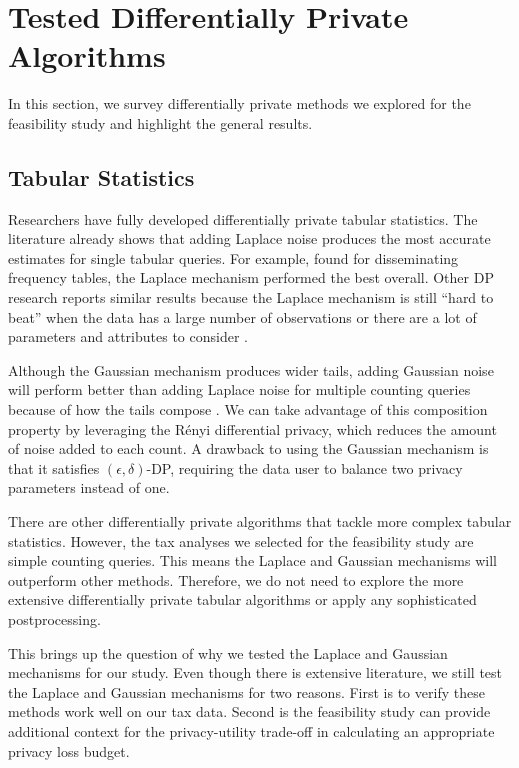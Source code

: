 \section{Tested Differentially Private Algorithms}\label{sec:dp-mech}
In this section, we survey differentially private methods we explored for the feasibility study and highlight the general results.

\subsection{Tabular Statistics}
Researchers have fully developed differentially private tabular statistics. The literature already shows that adding Laplace noise produces the most accurate estimates for single tabular queries. For example, \citet{rinott2018confidentiality} found for disseminating frequency tables, the Laplace mechanism performed the best overall. Other DP research reports similar results because the Laplace mechanism is still ``hard to beat'' when the data has a large number of observations or there are a lot of parameters and attributes to consider \citep{bowen2021differentially,shlomo2018statistical,liu2018generalized}.

Although the Gaussian mechanism produces wider tails, adding Gaussian noise will perform better than adding Laplace noise for multiple counting queries because of how the tails compose \citet{wang2019subsampled}. We can take advantage of this composition property by leveraging the R\'enyi differential privacy, which reduces the amount of noise added to each count. A drawback to using the Gaussian mechanism is that it satisfies $(\epsilon,\delta)$-DP, requiring the data user to balance two privacy parameters instead of one.

There are other differentially private algorithms that tackle more complex tabular statistics. However, the tax analyses we selected for the feasibility study are simple counting queries. This means the Laplace and Gaussian mechanisms will outperform other methods. Therefore, we do not need to explore the more extensive differentially private tabular algorithms or apply any sophisticated postprocessing.

This brings up the question of why we tested the Laplace and Gaussian mechanisms for our study. Even though there is extensive literature, we still test the Laplace and Gaussian mechanisms for two reasons. First is to verify these methods work well on our tax data. Second is the feasibility study can provide additional context for the privacy-utility trade-off in calculating an appropriate privacy loss budget.

